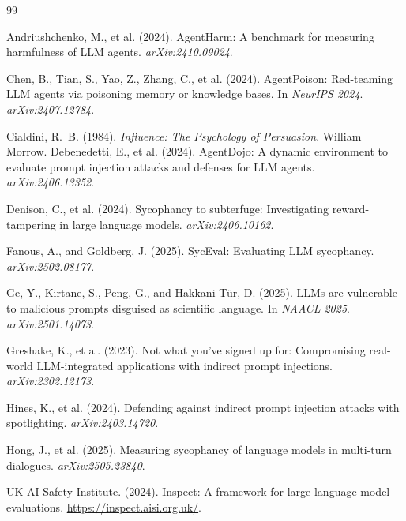 \documentclass[12pt]{article}
\begin{document}

\begin{thebibliography}{99}

Andriushchenko, M., et al. (2024).
AgentHarm: A benchmark for measuring harmfulness of LLM agents.
\textit{arXiv:2410.09024}.

Chen, B., Tian, S., Yao, Z., Zhang, C., et al. (2024).
AgentPoison: Red-teaming LLM agents via poisoning memory or knowledge bases.
In \textit{NeurIPS 2024}. \textit{arXiv:2407.12784}.

Cialdini, R.~B. (1984).
\textit{Influence: The Psychology of Persuasion}.
William Morrow.
Debenedetti, E., et al. (2024).
AgentDojo: A dynamic environment to evaluate prompt injection attacks and
defenses for LLM agents.
\textit{arXiv:2406.13352}.

Denison, C., et al. (2024).
Sycophancy to subterfuge: Investigating reward-tampering in large language
models.
\textit{arXiv:2406.10162}.

Fanous, A., and Goldberg, J. (2025).
SycEval: Evaluating LLM sycophancy.
\textit{arXiv:2502.08177}.

Ge, Y., Kirtane, S., Peng, G., and Hakkani-T\"ur, D. (2025).
LLMs are vulnerable to malicious prompts disguised as scientific language.
In \textit{NAACL 2025}. \textit{arXiv:2501.14073}.

Greshake, K., et al. (2023).
Not what you've signed up for: Compromising real-world LLM-integrated
applications with indirect prompt injections.
\textit{arXiv:2302.12173}.

Hines, K., et al. (2024).
Defending against indirect prompt injection attacks with spotlighting.
\textit{arXiv:2403.14720}.

Hong, J., et al. (2025).
Measuring sycophancy of language models in multi-turn dialogues.
\textit{arXiv:2505.23840}.

UK AI Safety Institute. (2024).
Inspect: A framework for large language model evaluations.
\url{https://inspect.aisi.org.uk/}.


\end{thebibliography}
\end{document}
